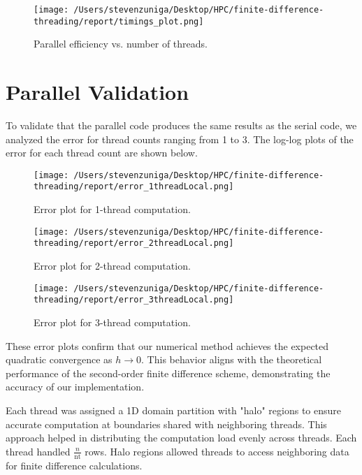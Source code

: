 \documentclass[12pt]{article}
\begin{document}
\begin{figure}[h!]
\centering
\texttt{[image: /Users/stevenzuniga/Desktop/HPC/finite-difference-threading/report/timings\_plot.png]}
\caption{Parallel efficiency vs. number of threads.}
\label{fig:timing_plots}
\end{figure}

\section{Parallel Validation}

To validate that the parallel code produces the same results as the serial code, we analyzed the error for thread counts ranging from 1 to 3. The log-log plots of the error for each thread count are shown below.

\begin{figure}[H]
\centering
\texttt{[image: /Users/stevenzuniga/Desktop/HPC/finite-difference-threading/report/error\_1threadLocal.png]}
\caption{Error plot for 1-thread computation.}
\label{fig:error_1threads}
\end{figure}

\begin{figure}[H]
\centering
\texttt{[image: /Users/stevenzuniga/Desktop/HPC/finite-difference-threading/report/error\_2threadLocal.png]}
\caption{Error plot for 2-thread computation.}
\label{fig:error_2threads}
\end{figure}

\begin{figure}[H]
\centering
\texttt{[image: /Users/stevenzuniga/Desktop/HPC/finite-difference-threading/report/error\_3threadLocal.png]}
\caption{Error plot for 3-thread computation.}
\label{fig:error_3threads}
\end{figure}

These error plots confirm that our numerical method achieves the expected quadratic convergence as \( h \rightarrow 0 \). This behavior aligns with the theoretical performance of the second-order finite difference scheme, demonstrating the accuracy of our implementation.

Each thread was assigned a 1D domain partition with "halo" regions to ensure accurate computation at boundaries shared with neighboring threads. This approach helped in distributing the computation load evenly across threads. Each thread handled \(\frac{n}{\text{nt}}\) rows. Halo regions allowed threads to access neighboring data for finite difference calculations.
\end{document}
